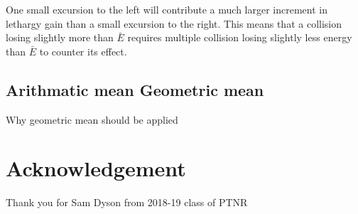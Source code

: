 \documentclass[a4paper, 12pt]{article}
\begin{document}
	One small excursion to the left will contribute a much larger increment in lethargy gain than a small excursion to the right. 
	This means that a collision losing slightly more than $\bar{E}$ requires multiple collision losing slightly less energy than $\bar{E}$ to counter its effect.

\subsection{Arithmatic mean Geometric mean}
	Why geometric mean should be applied

\section{Acknowledgement}
	Thank you for Sam Dyson from 2018-19 class of PTNR
\end{document}

